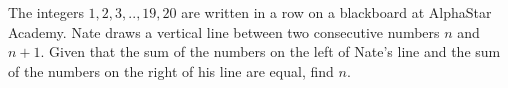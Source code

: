 The integers $ 1, 2, 3, .., 19, 20$ are written in a row on a blackboard at AlphaStar Academy. Nate draws a vertical line between two consecutive numbers $n$ and $n + 1$. Given that the sum of the numbers on the left of Nate's line and the sum of the numbers on the right of his line are equal, find $n$.
